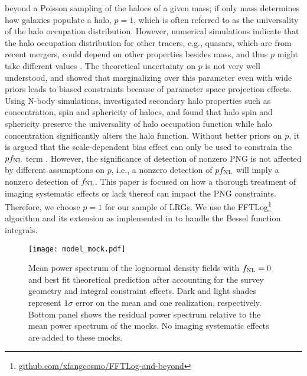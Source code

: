 beyond a Poisson sampling of the haloes of a given mass; if only mass determines how galaxies populate a halo, $p=1$, which is often referred to as the universality of the halo occupation distribution. However, numerical simulations indicate that the halo occupation distribution for other tracers, e.g., quasars, which are from recent mergers, could depend on other properties besides mass, and thus $p$ might take different values \citep[see, e.g.,][]{slosar2008constraints}. The theoretical uncertainty on $p$ is not very well understood, and \cite{2022JCAP...11..013B} showed that marginalizing over this parameter even with wide priors leads to biased constraints because of parameter space projection effects. Using N-body simulations, \cite{2023JCAP...01..023L} investigated secondary halo properties such as concentration, spin and sphericity of haloes, and found that halo spin and sphericity preserve the universality of halo occupation function while halo concentration significantly alters the halo function. Without better priors on $p$, it is argued that the scale-dependent bias effect can only  be used to constrain the $pf_{\rm NL}$ term \citep[see, e.g.,][]{2020JCAP...12..013B, 2020JCAP...12..031B}. However, the significance of detection of nonzero PNG is not affected by different assumptions on $p$, i.e., a nonzero detection of $pf_{\rm NL}$ will imply a nonzero detection of $f_{\rm NL}$. This paper is focused on how a thorough treatment of imaging systematic effects or lack thereof can impact the PNG constraints. Therefore, we choose $p=1$ for our sample of LRGs. We use the FFTLog\footnote{\href{https://github.com/xfangcosmo/FFTLog-and-beyond}{github.com/xfangcosmo/FFTLog-and-beyond}} algorithm and its extension as implemented in \cite{fang2020beyond} to handle the Bessel function integrals.

 \begin{figure}
\centering
\texttt{[image: model\_mock.pdf]}
\caption{Mean power spectrum of the lognormal density fields with $f_{\rm NL}=0$ and best fit theoretical prediction after accounting for the survey geometry and integral constraint effects. Dark and light shades represent $1\sigma$ error on the mean and one realization, respectively. Bottom panel shows the residual power spectrum relative to the mean power spectrum of the mocks. No imaging systematic effects are added to these mocks.}\label{fig:model_mock}
\end{figure}


